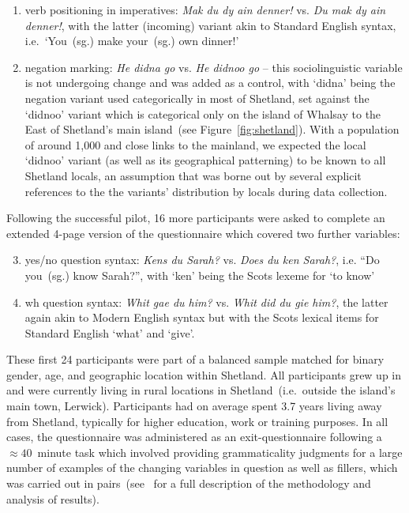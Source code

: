 \begin{enumerate}
\item verb positioning in imperatives: \emph{Mak du dy ain denner!} vs. \emph{Du mak dy ain denner!}, with the latter (incoming) variant akin to Standard English syntax, i.e.~`You~(sg.) make your~(sg.) own dinner!'
\item negation marking: \emph{He didna go} vs. \emph{He didnoo go} -- this sociolinguistic variable is not undergoing change and was added as a control, with `didna' being the negation variant used categorically in most of Shetland, set against the `didnoo' variant which is categorical only on the island of Whalsay to the East of Shetland's main island~(see Figure~\ref{fig:shetland}). With a population of around 1,000 and close links to the mainland, we expected the local `didnoo' variant (as well as its geographical patterning) to be known to all Shetland locals, an assumption that was borne out by several explicit references to the the variants' distribution by locals during data collection. %
\end{enumerate}

Following the successful pilot, 16 more participants were asked to complete an extended 4-page version of the questionnaire which covered two further variables:

\begin{enumerate}
\setcounter{enumi}{2}
\item yes/no question syntax: \emph{Kens du Sarah?} vs. \emph{Does du ken Sarah?}, i.e. ``Do you~(sg.) know Sarah?'', with `ken' being the Scots lexeme for `to know'
\item wh question syntax: \emph{Whit gae du him?} vs. \emph{Whit did du gie him?}, the latter again akin to Modern English syntax but with the Scots lexical items for Standard English `what' and `give'.
\end{enumerate}

These first 24 participants were part of a balanced sample matched for binary gender, age, and geographic location within Shetland. All participants grew up in and were currently living in rural locations in Shetland~(i.e.~outside the island's main town, Lerwick). Participants had on average spent 3.7 years living away from Shetland, typically for higher education, work or training purposes. In all cases, the questionnaire was administered as an exit-questionnaire following a $\approx40$~minute task which involved providing grammaticality judgments for a large number of examples of the changing variables in question as well as fillers, which was carried out in pairs~(see~\citealt{Jamieson2015} for a full description of the methodology and analysis of results). %

